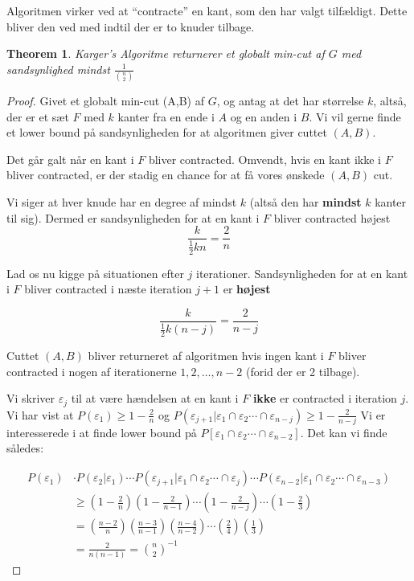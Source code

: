 \documentclass[11pt]{article}
\newtheorem{theorem}{Theorem}
\theoremstyle{definition}
\theoremstyle{remark}
\begin{document}
Algoritmen virker ved at ``contracte'' en kant, som den har valgt tilfældigt. Dette bliver den ved med indtil der er to knuder tilbage. 

\begin{theorem}
  Karger's Algoritme returnerer et globalt min-cut af $G$ med sandsynlighed mindst $\frac{1}{\binom{n}{2}}$

\end{theorem}

\begin{proof}
Givet et globalt min-cut (A,B) af $G$, og antag at det har størrelse $k$, altså, der er et sæt $F$ med $k$ kanter fra en ende i $A$ og en anden i $B$. Vi vil gerne finde et lower bound på sandsynligheden for at algoritmen giver cuttet $(A,B)$.

Det går galt når en kant i $F$ bliver contracted. Omvendt, hvis en kant ikke i $F$ bliver contracted, er der stadig en chance for at få vores ønskede $(A,B)$ cut.

Vi siger at hver knude har en degree af mindst $k$ (altså den har \textbf{mindst} $k$ kanter til sig). Dermed er sandsynligheden for at en kant i $F$ bliver contracted højest
\[ \frac{k}{\frac{1}{2}kn} = \frac{2}{n} \]

Lad os nu kigge på situationen efter $j$ iterationer. Sandsynligheden for at en kant i $F$ bliver contracted i næste iteration $j+1$ er \textbf{højest}

\[ \frac{k}{\frac{1}{2}k(n-j)} = \frac{2}{n-j} \]

Cuttet $(A,B)$ bliver returneret af algoritmen hvis ingen kant i $F$ bliver contracted i nogen af iterationerne $1, 2, \ldots, n-2$ (forid der er 2 tilbage).

Vi skriver $\varepsilon_{j}$ til at være hændelsen at en kant i $F$ \textbf{ikke} er contracted i iteration $j$. Vi har vist at $P(\varepsilon_{1}) \geq 1 - \frac{2}{n}$ og $P(\varepsilon_{j+1}|\varepsilon_{1} \cap \varepsilon_{2} \cdots \cap \varepsilon_{n-j}) \geq 1 - \frac{2}{n-j}$
Vi er interesserede i at finde lower bound på $P[\varepsilon_{1} \cap \varepsilon_{2} \cdots \cap \varepsilon_{n-2}]$. Det kan vi finde således:

\begin{equation}
\begin{split}
  P(\varepsilon_{1}) &\cdot P(\varepsilon_{2}|\varepsilon_{1}) \cdots P(\varepsilon_{j+1}| \varepsilon_{1} \cap \varepsilon_{2} \cdots \cap \varepsilon_{j}) \cdots P(\varepsilon_{n-2}| \varepsilon_{1} \cap \varepsilon_{2} \cdots \cap \varepsilon_{n-3})\\
           &\geq \left( 1-\frac{2}{n} \right) \left( 1- \frac{2}{n-1} \right)\cdots \left( 1- \frac{2}{n-j} \right) \cdots \left( 1- \frac{2}{3}\right)\\
           &= \left( \frac{n-2}{n} \right) \left( \frac{n-3}{n-1} \right) \left( \frac{n-4}{n-2} \right) \cdots \left( \frac{2}{4} \right) \left( \frac{1}{3} \right)\\
  &= \frac{2}{n(n-1)} = \binom{n}{2}^{-1}
\end{split}
\end{equation}
\end{proof}
\end{document}
